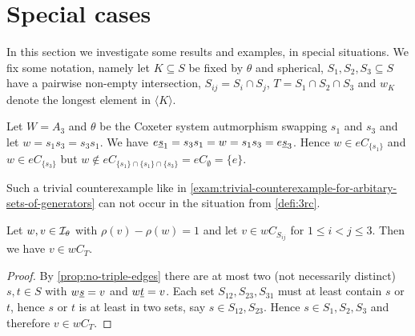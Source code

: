 \section{Special cases}
\label{sec:3rc-special-cases}

%
%		

In this section we investigate some results and examples, in special situations. We fix some notation, namely let $K \subseteq S$ be fixed by $\theta$ and spherical, $S_1,S_2,S_3 \subseteq S$ have a pairwise non-empty intersection, $S_{ij} = S_i \cap S_j$, $T = S_1 \cap S_2 \cap S_3$ and $w_K$ denote the longest element in $\langle K \rangle$.

\begin{exam}
	Let $W = A_3$ and $\theta$ be the Coxeter system autmorphism swapping $s_1$ and $s_3$ and let $w = s_1s_3 = s_3s_1$. We have $e \underline{s}_1 = s_3 s_1 = w = s_1 s_3 = e \underline{s}_3$. Hence $w \in eC_{\{s_1\}}$ and $w \in eC_{\{s_3\}}$ but $w \notin eC_{\{s_1\} \cap \{s_1\} \cap \{s_3\}} = eC_\emptyset = \{e\}$.
\end{exam}

Such a trivial counterexample like in \ref{exam:trivial-counterexample-for-arbitary-sets-of-generators} can not occur in the situation from \ref{defi:3rc}.

\begin{prop}
	Let $w,v \in \mathcal{I}_{\theta}$ with $\rho(v) - \rho(w) = 1$ and let $v \in w C_{S_{ij}}$ for $1 \leq i < j \leq 3$. Then we have $v \in wC_T$.

	\begin{proof}
		By \ref{prop:no-triple-edges} there are at most two (not necessarily distinct) $s,t \in S$ with $w \underline{s} = v$ and $w \underline{t} = v$. Each set $S_{12},S_{23},S_{31}$ must at least contain $s$ or $t$, hence $s$ or $t$ is at least in two sets, say $s \in S_{12},S_{23}$. Hence $s \in S_1,S_2,S_3$ and therefore $v \in wC_T$.
	\end{proof}
\end{prop}

